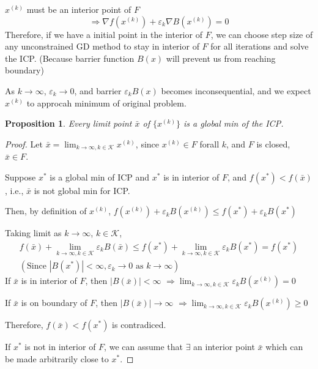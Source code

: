 \documentclass[11pt,a4paper]{article}
\newtheorem{proposition}{Proposition}
\begin{document}
$x^{(k)}$ must be an interior point of $F$
$$\Rightarrow \nabla f(x^{(k)})+\varepsilon_k \nabla B(x^{(k)})=0$$
Therefore, if we have a initial point in the interior of $F$, we can choose step size of any unconstrained GD method to stay in interior of $F$ for all iterations and solve the ICP. (Because barrier function $B(x)$ will prevent us from reaching boundary)

As $k \rightarrow \infty$, $\varepsilon_k \rightarrow 0$, and barrier $\varepsilon_k B(x)$ becomes inconsequential, and we expect $x^{(k)}$ to approcah minimum of original problem.

\begin{proposition}
    Every limit point $\bar{x}$ of $\{x^{(k)}\}$ is a global min of the ICP.
\end{proposition}
\begin{proof}
Let $\bar{x}=\lim_{k \rightarrow \infty, k\in \mathcal{K}}x^{(k)}$, since $x^{(k)}\in F$ forall $k$, and $F$ is closed, $\bar{x}\in F$.

Suppose $x^*$ is a global min of ICP and $x^*$ is in interior of $F$, and $f(x^*)<f(\bar{x})$, i.e., $\bar{x}$ is not global min for ICP.

Then, by definition of $x^{(k)}$, $f(x^{(k)})+\varepsilon_k B(x^{(k)})\leq f(x^*)+\varepsilon_k B(x^*)$

Taking limit as $k \rightarrow \infty$, $k\in \mathcal{K}$,
\begin{equation}
    \begin{aligned}
        f(\bar{x})+\lim_{k \rightarrow \infty, k\in \mathcal{K}}\varepsilon_k B(\bar{x})\leq f(x^*)+\lim_{k \rightarrow \infty, k\in \mathcal{K}}\varepsilon_k B(x^*)=f(x^*)\\
        (\text{Since }|B(x^*)|<\infty,\varepsilon_k \rightarrow	0\text{ as }k \rightarrow \infty)
    \end{aligned}
    \nonumber
\end{equation}
If $\bar{x}$ is in interior of $F$, then $|B(\bar{x})|<\infty$ $\Rightarrow \lim_{k \rightarrow \infty, k\in \mathcal{K}}\varepsilon_k B(x^{(k)})=0$

If $\bar{x}$ is on boundary of $F$, then $|B(\bar{x})| \rightarrow \infty$ $\Rightarrow \lim_{k \rightarrow \infty, k\in \mathcal{K}}\varepsilon_k B(x^{(k)})\geq 0$

Therefore, $f(\bar{x})<f(x^*)$ is contradiced.

If $x^*$ is not in interior of $F$, we can assume that $\exists$ an interior point $\bar{x}$ which can be made arbitrarily close to $x^*$.
\end{proof}
\end{document}

